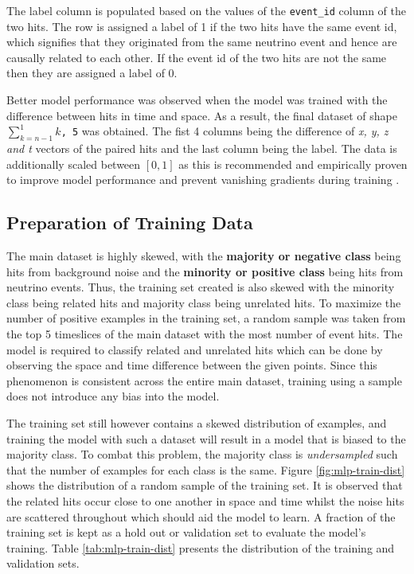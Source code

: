 The label column is populated based on the values of the
\texttt{event\_id} column of the two hits. The row is assigned a label
of 1 if the two hits have the same event id, which signifies that they
originated from the same neutrino event and hence are causally related
to each other. If the event id of the two hits are not the same then
they are assigned a label of 0.

Better model performance was observed when the model was trained with
the difference between hits in time and space. As a result, the final
dataset of shape \texttt{$\sum_{k=n-1}^{1}k$, 5} was obtained. The
fist 4 columns being the difference of \emph{x, y, z and t} vectors of
the paired hits and the last column being the label. The data is
additionally scaled between $[0,1]$ as this is recommended and
empirically proven to improve model performance and prevent vanishing
gradients during training
\cite{bengio2012practical,goodfellow-et-al-2016}.

\subsection{Preparation of Training Data}
\label{sec:mlp-data-prep-train}

The main dataset is highly skewed, with the \textbf{majority or
  negative class} being hits from background noise and the
\textbf{minority or positive class} being hits from neutrino events.
Thus, the training set created is also skewed with the minority class
being related hits and majority class being unrelated hits. To
maximize the number of positive examples in the training set, a random
sample was taken from the top 5 timeslices of the main dataset with
the most number of event hits. The model is required to classify
related and unrelated hits which can be done by observing the space
and time difference between the given points. Since this phenomenon is
consistent across the entire main dataset, training using a sample
does not introduce any bias into the model.

The training set still however contains a skewed distribution of
examples, and training the model with such a dataset will result in a
model that is biased to the majority class. To combat this problem,
the majority class is \emph{undersampled} such that the number of
examples for each class is the same. Figure \ref{fig:mlp-train-dist}
shows the distribution of a random sample of the training set. It is
observed that the related hits occur close to one another in space and
time whilst the noise hits are scattered throughout which should aid
the model to learn. A fraction of the training set is kept as a hold
out or validation set to evaluate the model's training. Table
\ref{tab:mlp-train-dist} presents the distribution of the training and
validation sets.

